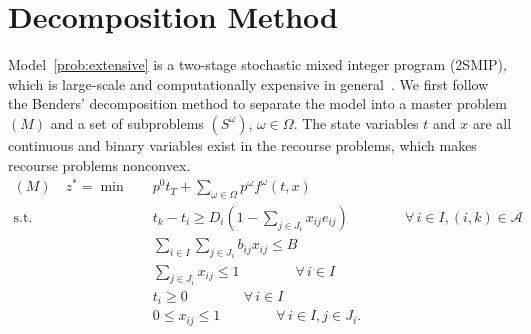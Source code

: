 \documentclass[11pt]{article}
\begin{document}
	\section{Decomposition Method} \label{sec:decomposition}
	Model~\eqref{prob:extensive} is a two-stage stochastic mixed integer program (2SMIP), which is large-scale and computationally expensive in general~\cite{ahmed2011smip}. We first follow the Benders' decomposition method to separate the model into a master problem \((M)\) and a set of subproblems \((S^\omega)\), \(\omega \in \Omega\). The state variables \(t\) and \(x\) are all continuous and binary variables exist in the recourse problems, which makes recourse problems nonconvex. 
	\begin{subequations}
		\label{prob:masterOri}
		\begin{align}
		(M) \quad z^* = \min \quad &p^0 t_T + \sum_{\omega \in \Omega} p^\omega f^\omega(t,x)\\
		\text{s.t.} \quad & t_k - t_i \geq D_{i}(1 - \sum_{j \in J_i} x_{ij} e_{ij}) \qquad \qquad \forall \,i \in I, (i,k) \in \mathcal{A} \label{cons:MSep}\\
		& \sum_{i \in I} \sum_{j \in J_i} b_{ij}x_{ij} \leq B  \label{cons:MBudget}\\
		& \sum_{j \in J_i} x_{ij} \leq 1  \qquad \qquad \forall \,i \in I \label{cons:MSingleBudget}\\
		& t_i \geq 0 \qquad \qquad \forall \,i \in I\\
		& 0 \leq x_{ij} \leq 1 \qquad \qquad \forall \,i \in I, j \in J_i. \label{cons:Mxbounds}
		\end{align}
	\end{subequations}
\end{document}
